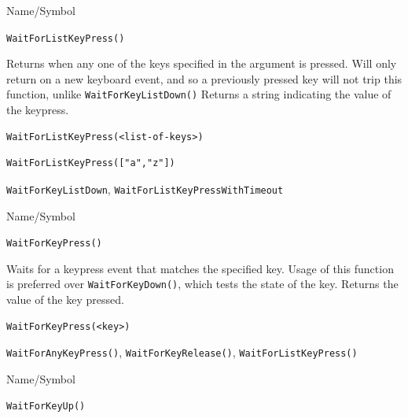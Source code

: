 \begin{desc}{Name/Symbol}
\item[Name/Symbol]  	\verb+WaitForListKeyPress()+

\item[Description] Returns when any one of the keys specified in the
  argument is pressed. Will only return on a new keyboard event, and
  so a previously pressed key will not trip this function, unlike
  \verb+WaitForKeyListDown()+  Returns a string indicating the value
  of the keypress.

\item[Usage]
\begin{verbatim}
WaitForListKeyPress(<list-of-keys>)
\end{verbatim}

\item[Example]     	
\begin{verbatim}
WaitForListKeyPress(["a","z"])
\end{verbatim}

\item[See Also]	
   \verb+WaitForKeyListDown+, \verb+WaitForListKeyPressWithTimeout+
 \end{desc}




\begin{desc}{Name/Symbol}
\item[Name/Symbol]  	\verb+WaitForKeyPress()+

\item[Description] Waits for a keypress event that matches the
  specified key.  Usage of this function is preferred over
  \verb+WaitForKeyDown()+, which tests the state of the key. Returns the
  value of the key pressed.

\item[Usage]
\begin{verbatim}
WaitForKeyPress(<key>)
\end{verbatim}

\item[Example]	

\item[See Also]     	\verb+WaitForAnyKeyPress()+, \verb+WaitForKeyRelease()+, \verb+WaitForListKeyPress()+
\end{desc}


\begin{desc}{Name/Symbol}
\item[Name/Symbol] 	\verb+WaitForKeyUp()+

\item[Description]	

\item[Usage]		

\item[Example]	

\item[See Also]	
\end{desc}



